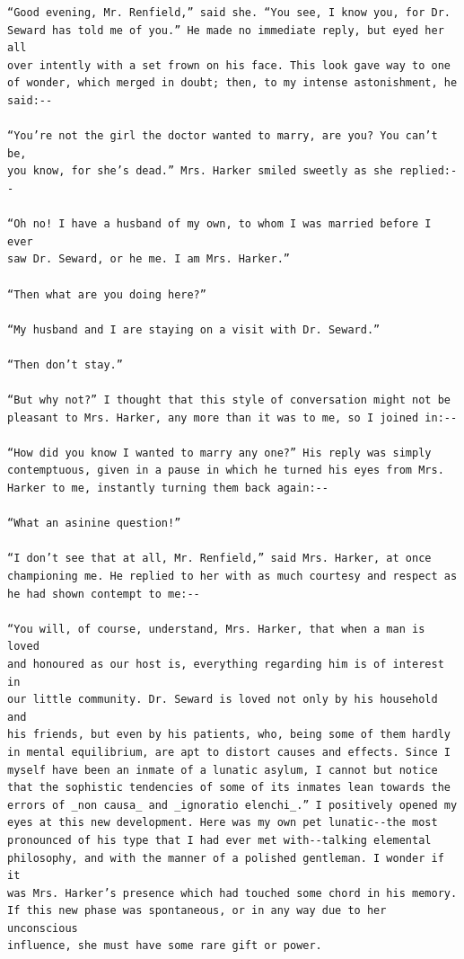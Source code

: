 \documentclass{article}
\begin{document}
\begin{verbatim}
“Good evening, Mr. Renfield,” said she. “You see, I know you, for Dr.
Seward has told me of you.” He made no immediate reply, but eyed her all
over intently with a set frown on his face. This look gave way to one
of wonder, which merged in doubt; then, to my intense astonishment, he
said:--

“You’re not the girl the doctor wanted to marry, are you? You can’t be,
you know, for she’s dead.” Mrs. Harker smiled sweetly as she replied:--

“Oh no! I have a husband of my own, to whom I was married before I ever
saw Dr. Seward, or he me. I am Mrs. Harker.”

“Then what are you doing here?”

“My husband and I are staying on a visit with Dr. Seward.”

“Then don’t stay.”

“But why not?” I thought that this style of conversation might not be
pleasant to Mrs. Harker, any more than it was to me, so I joined in:--

“How did you know I wanted to marry any one?” His reply was simply
contemptuous, given in a pause in which he turned his eyes from Mrs.
Harker to me, instantly turning them back again:--

“What an asinine question!”

“I don’t see that at all, Mr. Renfield,” said Mrs. Harker, at once
championing me. He replied to her with as much courtesy and respect as
he had shown contempt to me:--

“You will, of course, understand, Mrs. Harker, that when a man is loved
and honoured as our host is, everything regarding him is of interest in
our little community. Dr. Seward is loved not only by his household and
his friends, but even by his patients, who, being some of them hardly
in mental equilibrium, are apt to distort causes and effects. Since I
myself have been an inmate of a lunatic asylum, I cannot but notice
that the sophistic tendencies of some of its inmates lean towards the
errors of _non causa_ and _ignoratio elenchi_.” I positively opened my
eyes at this new development. Here was my own pet lunatic--the most
pronounced of his type that I had ever met with--talking elemental
philosophy, and with the manner of a polished gentleman. I wonder if it
was Mrs. Harker’s presence which had touched some chord in his memory.
If this new phase was spontaneous, or in any way due to her unconscious
influence, she must have some rare gift or power.


\end{verbatim}
\end{document}
